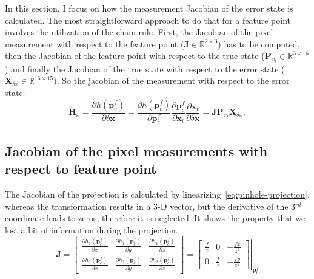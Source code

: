 In this section, I focus on how the measurement Jacobian of the error state is calculated. The most straightforward approach to do that for a feature point involves the utilization of the chain rule. First, the Jacobian of the pixel measurement with respect to the feature point ($\mathbf{J}\in\mathbb{R}^{2\times3}$) has to be computed, then the Jacobian of the feature point with respect to the true state ($\mathbf{P}_{x_t}\in\mathbb{R}^{3\times 16}$) and finally the Jacobian of the true state with respect to the error state ($\mathbf{X}_{\delta x}\in\mathbb{R}^{16\times 15}$). So the jacobian of the measurement with respect to the error state:
\begin{equation}
    \mathbf{H}_x=\frac{\partial h(\mathbf{p}_c^f)}{\partial\delta\mathbf{x}}= 
    \frac{\partial h(\mathbf{p}_c^f)}{\partial\mathbf{p}_c^f}
    \frac{\partial\mathbf{p}_c^f}{\partial\mathbf{x}_t}
    \frac{\partial\mathbf{x}_t}{\partial\delta\mathbf{x}} =\mathbf{J}\mathbf{P}_{x_t}\mathbf{X}_{\delta x},
\end{equation} 

\subsection*{Jacobian of the pixel measurements with respect to feature point}

The Jacobian of the projection is calculated by linearizing~\eqref{eq:pinhole-projection}, whereas the transformation results in a 3-D vector, but the derivative of the 3$^{rd}$ coordinate leads to zeros, therefore it is neglected. It shows the property that we lost a bit of information during the projection.
\begin{equation}
    \mathbf{J}=\begin{bmatrix}
        \frac{\partial h_1(\mathbf{p}_c^f)}{\partial x} & \frac{\partial h_1(\mathbf{p}_c^f)}{\partial y} & \frac{\partial h_1(\mathbf{p}_c^f)}{\partial z} \\
        \frac{\partial h_2(\mathbf{p}_c^f)}{\partial x} & \frac{\partial h_2(\mathbf{p}_c^f)}{\partial y} & \frac{\partial h_2(\mathbf{p}_c^f)}{\partial z}
    \end{bmatrix} = \left.\begin{bmatrix}
        \frac{f}{z} & 0 & -\frac{fx}{z^2} \\
        0 & \frac{f}{z} & -\frac{fy}{z^2}
    \end{bmatrix}\right\vert_{\mathbf{p}_c^f}
    \label{eq:p-der-by-xt}
\end{equation}

